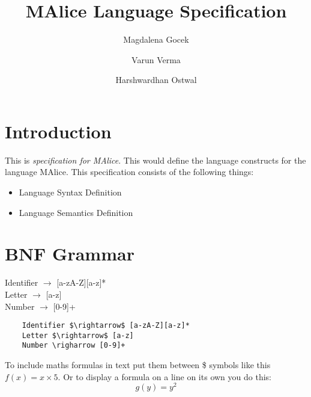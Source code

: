 \documentclass[a4wide, 11pt]{article}
\begin{document}
\title{MAlice Language Specification}

\author{Magdalena Gocek \and Varun Verma \and Harshwardhan Ostwal}


\maketitle            %

\section{Introduction}

This is \emph{specification for MAlice}. This would define the language
constructs for the language MAlice. This specification consists of
the following things:
\begin{itemize}
	\item Language Syntax Definition
	\item Language Semantics Definition
\end{itemize}



\section{BNF Grammar} 
	Identifier $\rightarrow$ [a-zA-Z][a-z]*
	\\
	Letter $\rightarrow$ [a-z]
	\\
	Number $\rightarrow$ [0-9]+

\begin{verbatim}
	Identifier $\rightarrow$ [a-zA-Z][a-z]*
	Letter $\rightarrow$ [a-z]
	Number \righarrow [0-9]+
\end{verbatim}

To include maths formulas in text put them between \$ symbols like this
$f(x) = x \times 5$.
Or to display a formula on a line on its own you do this:
\[
    g(y) = y^2
\]
\end{document}
